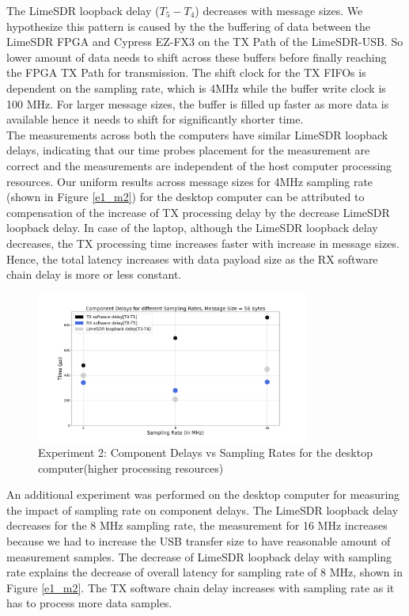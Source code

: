 The LimeSDR loopback delay ($T_5 - T_4$) decreases with message sizes.
We hypothesize this pattern is caused by the the buffering of data between the LimeSDR \ac{FPGA} and Cypress EZ-FX3 on the TX Path of the LimeSDR-USB.
So lower amount of data needs to shift across these buffers before finally reaching the \ac{FPGA} TX Path for transmission.
The shift clock for the TX FIFOs is dependent on the sampling rate, which is 4MHz while the buffer write clock is 100 MHz.
For larger message sizes, the buffer is filled up faster as more data is available hence it needs to shift for significantly shorter time. \\

The measurements across both the computers have similar LimeSDR loopback delays, indicating that our time probes placement for the measurement are correct and the measurements are independent of the host computer processing resources.
Our uniform results across message sizes for 4MHz sampling rate (shown in Figure \ref{e1_m2}) for the desktop computer can be attributed to compensation of the increase of TX processing delay by the decrease LimeSDR loopback delay.
In case of the laptop, although the LimeSDR loopback delay decreases, the TX processing time increases faster with increase in message sizes.
Hence, the total latency increases with data payload size as the RX software chain delay is more or less constant.

\begin{figure}[h!]
\centering
\includegraphics[width=0.8\textwidth]{Thesis/Figure/E2_M2_2.png}
\caption{Experiment 2: Component Delays vs Sampling Rates for the desktop computer(higher processing resources)}
\label{e2_m2_1}
\end{figure}

An additional experiment was performed on the desktop computer for measuring the impact of sampling rate on component delays.
The LimeSDR loopback delay decreases for the 8 MHz sampling rate, the measurement for 16 MHz increases because we had to increase the USB transfer size to have reasonable amount of measurement samples.
The decrease of LimeSDR loopback delay with sampling rate explains the decrease of overall latency for sampling rate of 8 MHz, shown in Figure \ref{e1_m2}.
The TX software chain delay increases with sampling rate as it has to process more data samples.

